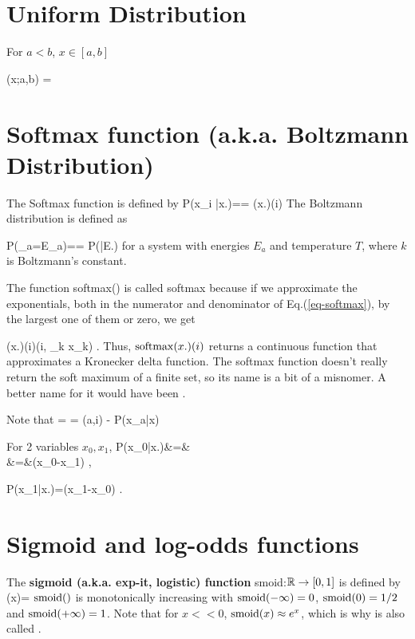 \section{Uniform Distribution}
For $a<b$, $x\in [a,b]$

\beq
\calu(x;a,b) =
\eeq

\section {Softmax function
(a.k.a. Boltzmann Distribution)}

The Softmax function
 is defined by
\beq
P(x_i
|x.)==
\softmax(x.)(i)
\label{eq-softmax}
\eeq
The
Boltzmann distribution is defined as

\beq
P(\rvE_a=E_a)==
P(|E.)\eeq
for a system with energies $E_a$
and temperature $T$,
where $k$
is Boltzmann's constant.

The function
softmax() is called softmax because if we
approximate the exponentials,
 both in the numerator and denominator
of Eq.(\ref{eq-softmax}),
by the largest one
of them or zero,
we get

\beq
\softmax(x.)(i)\approx \delta(i, \argmax_k x_k)
\;.
\eeq
Thus, ${\rm softmax}(x.)(i)$
returns a continuous
function that approximates a 
Kronecker delta function. 
The softmax function doesn't really
return the soft maximum of a finite set, so
its name is a bit of a misnomer.
A better name for it would have been .

Note that
\beq
{}
=
\ln{}
=
\delta(a,i)
-
P(x_a|x)
\eeq

For 2 variables $x_0, x_1$,
\beqa
P(x_0|x.)&=&
\\
&=&\smoid(x_0-x_1)
\;,
\eeqa

\beq
P(x_1|x.)=\smoid(x_1-x_0)
\;.
\eeq

\section{Sigmoid and log-odds functions}
\label{sec-smoid}
The {\bf sigmoid (a.k.a. exp-it,  logistic) function} smoid:${ \mathbb{R}}\rightarrow [0,1]$
is defined by
\beq
\smoid(x)=
\eeq
${\rm smoid}()$ is monotonically
increasing with ${\rm smoid}(-\infty)=0$,
${\rm smoid}(0)=1/2$
and ${\rm smoid}(+\infty)=1$.
Note that for $x<<0$, ${\rm smoid}(x)\approx e^x$, which
is why  is also called .

